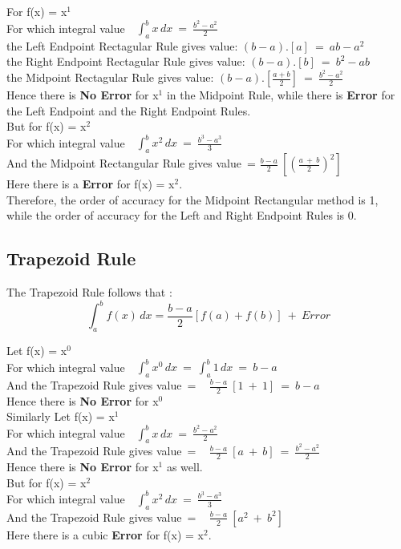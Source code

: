 \documentclass[11pt]{article}
\begin{document}
For f(x) = x$^1$\\
For which integral value~~$\int_{a}^{b} x \,dx~=~\frac{b^2-a^2}{2}$\\
the Left Endpoint Rectagular Rule gives value: $(b-a).[a]~=~ab-a^2$\\
the Right Endpoint Rectagular Rule gives value: $(b-a).[b]~=~b^2-ab$\\
the Midpoint Rectagular Rule gives value: $(b-a).[\frac{a+b}{2}]~=~\frac{b^2-a^2}{2}$\\
Hence there is \textbf{No Error} for x$^1$ in the Midpoint Rule, while there is \textbf{Error} for the Left Endpoint and the Right Endpoint Rules.\\

But for f(x) = x$^2$\\
For which integral value~~$\int_{a}^{b} x^2 \,dx~=~\frac{b^3-a^3}{3}$\\
And the Midpoint Rectangular Rule gives value~= $\frac{b-a}{2}~[(\frac{a~+~b}{2})^2]$\\
Here there is a \textbf{ Error} for f(x) = x$^2$.\\

Therefore, the order of accuracy for the Midpoint Rectangular method is 1,\\
while the order of accuracy for the Left and Right Endpoint Rules is 0.
\subsection{Trapezoid Rule}
The Trapezoid Rule follows that : 
\[ \int_{a}^{b}f(x) \,dx = \frac{b-a}{2}[f(a)+f(b)]~+~Error\]

Let f(x) = x$^0$\\
For which integral value~~$\int_{a}^{b} x^0 \,dx~=~\int_{a}^{b} 1 \,dx~=~ b-a$\\
And the Trapezoid Rule gives value~= ~ $\frac{b-a}{2}~[1~+~1]~=~b-a$\\
Hence there is \textbf{No Error} for x$^0$ \\

Similarly Let f(x) = x$^1$\\
For which integral value~~$\int_{a}^{b} x \,dx~=~\frac{b^2-a^2}{2}$\\
And the Trapezoid Rule gives value~= ~ $\frac{b-a}{2}~[a~+~b]~=~\frac{b^2-a^2}{2}$\\
Hence there is \textbf{No Error} for x$^1$ as well.\\

But for f(x) = x$^2$\\
For which integral value~~$\int_{a}^{b} x^2 \,dx~=~\frac{b^3-a^3}{3}$\\
And the Trapezoid Rule gives value~= ~ $\frac{b-a}{2}~[a^2~+~b^2]$\\
Here there is a cubic\textbf{ Error} for f(x) = x$^2$.\\
\end{document}
